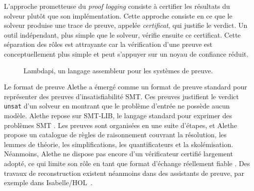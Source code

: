 L'approche prometteuse du \emph{proof logging} \cite{acmsmt} consiste à certifier les résultats du solveur plutôt que son implémentation.
Cette approche consiste en ce que le solveur produise une trace de preuve, appelée \emph{certificat}, qui justifie le verdict.
Un outil indépendant, plus simple que le solveur, vérifie ensuite ce certificat. Cette séparation des rôles est attrayante car la vérification d’une preuve est conceptuellement plus simple et peut s’appuyer sur un noyau de confiance réduit.

\begin{figure}[b]
    \centering
    \caption{Lambdapi, un langage assembleur pour les systèmes de preuve.}
    \label{fig:fr-interop-intro}
\end{figure}

Le format de preuve Alethe \cite{alethe} a émergé comme un format de preuve standard pour représenter des preuves d’insatisfiabilité SMT.
Ces preuves justifient le verdict \texttt{unsat} d’un solveur en montrant que le problème d’entrée ne possède aucun modèle.
Alethe repose sur SMT-LIB, le langage standard pour exprimer des problèmes SMT \cite{smtlib}. Les preuves sont organisées en une suite d’étapes, et Alethe propose un catalogue de règles de raisonnement couvrant la résolution, les lemmes de théorie, les simplifications, les quantificateurs et la skolémisation. 
Néanmoins, Alethe ne dispose pas encore d’un vérificateur certifié largement adopté, ce qui limite son rôle en tant que format d’échange réellement fiable \cite{carcara}.
Des travaux de reconstruction existent néanmoins dans des assistants de preuve, par exemple dans Isabelle/HOL~\cite{aletheInIsa,IsaRare}.


